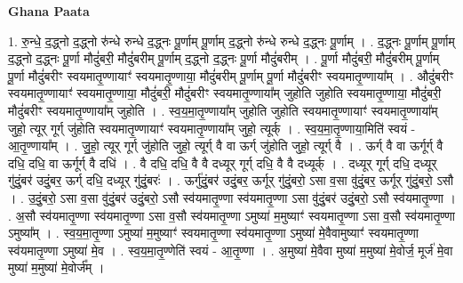 \documentclass[17pt]{extarticle}
\begin{document}
\textbf{Ghana Paata } \newline

1. रु॒न्धे॒ द॒द्ध्नो द॒द्ध्नो रु॑न्धे रुन्धे द॒द्ध्नः पू॒र्णाम् पू॒र्णाम् द॒द्ध्नो रु॑न्धे रुन्धे द॒द्ध्नः पू॒र्णाम् । . द॒द्ध्नः पू॒र्णाम् पू॒र्णाम् द॒द्ध्नो द॒द्ध्नः पू॒र्णा मौदुं॑बरी॒ मौदुं॑बरीम् पू॒र्णाम् द॒द्ध्नो द॒द्ध्नः पू॒र्णा मौदुं॑बरीम् । . पू॒र्णा मौदुं॑बरी॒ मौदुं॑बरीम् पू॒र्णाम् पू॒र्णा मौदुं॑बरीꣳ स्वयमातृ॒ण्णायाꣳ॑ स्वयमातृ॒ण्णाया॒ मौदुं॑बरीम् पू॒र्णाम् पू॒र्णा मौदुं॑बरीꣳ स्वयमातृ॒ण्णाया᳚म् । . औदुं॑बरीꣳ स्वयमातृ॒ण्णायाꣳ॑ स्वयमातृ॒ण्णाया॒ मौदुं॑बरी॒ मौदुं॑बरीꣳ स्वयमातृ॒ण्णाया᳚म् जुहोति जुहोति स्वयमातृ॒ण्णाया॒ मौदुं॑बरी॒ मौदुं॑बरीꣳ स्वयमातृ॒ण्णाया᳚म् जुहोति । . स्व॒य॒मा॒तृ॒ण्णाया᳚म् जुहोति जुहोति स्वयमातृ॒ण्णायाꣳ॑ स्वयमातृ॒ण्णाया᳚म् जुहो॒ त्यूर् गूर्ग् जु॑होति स्वयमातृ॒ण्णायाꣳ॑ स्वयमातृ॒ण्णाया᳚म् जुहो॒ त्यूर्क् । . स्व॒य॒मा॒तृ॒ण्णाया॒मिति॑ स्वयं - आ॒तृ॒ण्णाया᳚म् । . जु॒हो॒ त्यूर् गूर्ग् जु॑होति जुहो॒ त्यूर्ग् वै वा ऊर्ग् जु॑होति जुहो॒ त्यूर्ग् वै । . ऊर्ग् वै वा ऊर्गूर्ग् वै दधि॒ दधि॒ वा ऊर्गूर्ग् वै दधि॑ । . वै दधि॒ दधि॒ वै वै दध्यूर् गूर्ग् दधि॒ वै वै दध्यूर्क् । . दध्यूर् गूर्ग् दधि॒ दध्यूर् गु॑दुं॒बर॑ उदुं॒बर॒ ऊर्ग् दधि॒ दध्यूर् गु॑दुं॒बरः॑ । . ऊर्गु॑दुं॒बर॑ उदुं॒बर॒ ऊर्गूर् गु॑दुं॒बरो॒ ऽसा व॒सा वु॑दुं॒बर॒ ऊर्गूर् गु॑दुं॒बरो॒ ऽसौ । . उ॒दुं॒बरो॒ ऽसा व॒सा वु॑दुं॒बर॑ उदुं॒बरो॒ ऽसौ स्व॑यमातृ॒ण्णा स्व॑यमातृ॒ण्णा ऽसा वु॑दुं॒बर॑ उदुं॒बरो॒ ऽसौ स्व॑यमातृ॒ण्णा । . अ॒सौ स्व॑यमातृ॒ण्णा स्व॑यमातृ॒ण्णा ऽसा व॒सौ स्व॑यमातृ॒ण्णा ऽमुष्या॑ म॒मुष्याꣳ॑ स्वयमातृ॒ण्णा ऽसा व॒सौ स्व॑यमातृ॒ण्णा ऽमुष्या᳚म् । . स्व॒य॒मा॒तृ॒ण्णा ऽमुष्या॑ म॒मुष्याꣳ॑ स्वयमातृ॒ण्णा स्व॑यमातृ॒ण्णा ऽमुष्या॑ मे॒वैवामुष्याꣳ॑ स्वयमातृ॒ण्णा स्व॑यमातृ॒ण्णा ऽमुष्या॑ मे॒व । . स्व॒य॒मा॒तृ॒ण्णेति॑ स्वयं - आ॒तृ॒ण्णा । . अ॒मुष्या॑ मे॒वैवा मुष्या॑ म॒मुष्या॑ मे॒वोर्ज॒ मूर्ज॑ मे॒वा मुष्या॑ म॒मुष्या॑ मे॒वोर्ज᳚म् । \newline
\end{document}
